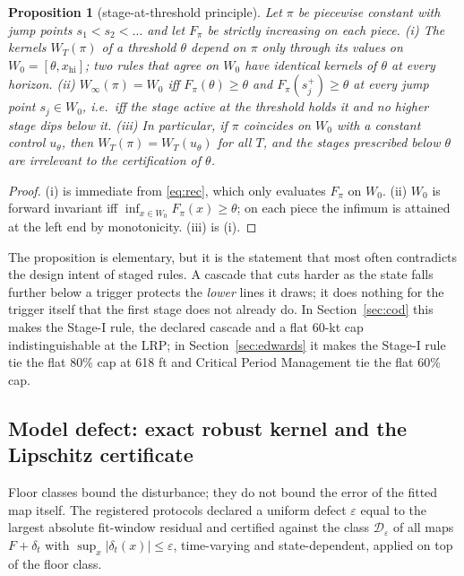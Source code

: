 \documentclass[11pt,a4paper]{article}
\theoremstyle{plain}
\newtheorem{proposition}[theorem]{Proposition}
\theoremstyle{definition}
\theoremstyle{remark}
\newcommand{\safe}{W_0}
\newcommand{\LRP}{\theta}
\begin{document}
\begin{proposition}[stage-at-threshold principle]\label{prop:stage}
Let $\pi$ be piecewise constant with jump points $s_1<s_2<\dots$ and let $F_\pi$ be strictly increasing on each piece. (i) The kernels $W_T(\pi)$ of a threshold $\LRP$ depend on $\pi$ only through its values on $\safe=[\LRP,x_{\mathrm{hi}}]$; two rules that agree on $\safe$ have identical kernels of $\LRP$ at every horizon. (ii) $W_\infty(\pi)=\safe$ iff $F_\pi(\LRP)\ge\LRP$ and $F_\pi(s_j^{+})\ge\LRP$ at every jump point $s_j\in\safe$, i.e.\ iff the stage active at the threshold holds it and no higher stage dips below it. (iii) In particular, if $\pi$ coincides on $\safe$ with a constant control $u_\LRP$, then $W_T(\pi)=W_T(u_\LRP)$ for all $T$, and the stages prescribed below $\LRP$ are irrelevant to the certification of $\LRP$.
\end{proposition}
\begin{proof}
(i) is immediate from \eqref{eq:rec}, which only evaluates $F_\pi$ on $\safe$. (ii) $\safe$ is forward invariant iff $\inf_{x\in\safe}F_\pi(x)\ge\LRP$; on each piece the infimum is attained at the left end by monotonicity. (iii) is (i).
\end{proof}

The proposition is elementary, but it is the statement that most often contradicts the design intent of staged rules. A cascade that cuts harder as the state falls further below a trigger protects the \emph{lower} lines it draws; it does nothing for the trigger itself that the first stage does not already do. In Section~\ref{sec:cod} this makes the Stage-I rule, the declared cascade and a flat 60-kt cap indistinguishable at the LRP; in Section~\ref{sec:edwards} it makes the Stage-I rule tie the flat 80\% cap at 618 ft and Critical Period Management tie the flat 60\% cap.

\subsection{Model defect: exact robust kernel and the Lipschitz certificate}\label{sec:defect}

Floor classes bound the disturbance; they do not bound the error of the fitted map itself. The registered protocols declared a uniform defect $\varepsilon$ equal to the largest absolute fit-window residual and certified against the class $\mathcal D_\varepsilon$ of all maps $F+\delta_t$ with $\sup_x|\delta_t(x)|\le\varepsilon$, time-varying and state-dependent, applied on top of the floor class.
\end{document}

